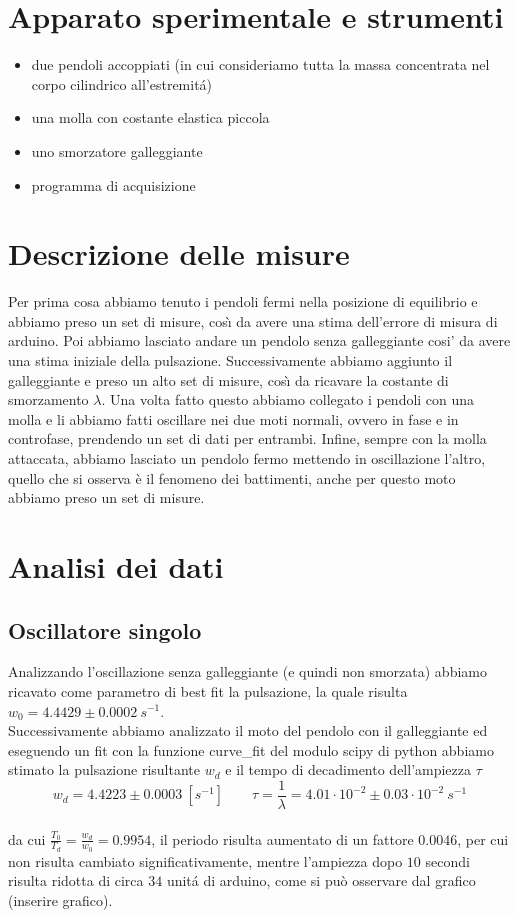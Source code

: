 \documentclass{article}
\begin{document}
	\section{Apparato sperimentale e strumenti}
	\begin{itemize}
		\item due pendoli accoppiati (in cui consideriamo tutta la massa concentrata nel corpo cilindrico all'estremit\'{a})
		\item una molla con costante elastica piccola
		\item uno smorzatore galleggiante
		\item programma di acquisizione 
	\end{itemize}
	
	\section{Descrizione delle misure}
		Per prima cosa abbiamo tenuto i pendoli fermi nella posizione di equilibrio e abbiamo preso un set di misure, cos\`{\i} da avere una stima dell'errore di misura di arduino. Poi abbiamo lasciato andare un pendolo senza galleggiante cosi' da avere una stima iniziale della pulsazione. Successivamente abbiamo aggiunto il galleggiante e preso un alto set di misure, cos\`{\i} da ricavare la costante di smorzamento $\lambda$. Una volta fatto questo abbiamo collegato i pendoli con una molla e li abbiamo fatti oscillare nei due moti normali, ovvero in fase e in controfase, prendendo un set di dati per entrambi. Infine, sempre con la molla attaccata, abbiamo lasciato un pendolo fermo mettendo in oscillazione l'altro, quello che si osserva \`{e} il fenomeno dei battimenti, anche per questo moto abbiamo preso un set di misure.
		
	\section{Analisi  dei dati}
	\subsection{Oscillatore singolo}
	Analizzando l'oscillazione senza galleggiante (e quindi non smorzata) abbiamo ricavato come parametro di best fit la pulsazione, la quale risulta $w_0 = 4.4429 \pm 0.0002\ s^{-1}$.\\
	Successivamente abbiamo analizzato il moto del pendolo con il galleggiante ed eseguendo un fit con la funzione curve\_fit del modulo scipy di python abbiamo stimato la pulsazione risultante $w_d$ e il tempo di decadimento dell'ampiezza $\tau$
	\begin{equation*}
	w_d = 4.4223 \pm 0.0003\ [s^{-1}]\qquad \tau = \frac{1}{\lambda} = 4.01\cdot10^{-2} \pm 0.03\cdot10^{-2}\ s^{-1}
	\end{equation*}\\
	da cui $\frac{T_0}{T_d} = \frac{w_d}{w_0} = 0.9954$, il periodo risulta aumentato di un fattore $0.0046$, per cui non risulta cambiato significativamente, mentre l'ampiezza dopo $10$ secondi risulta ridotta di circa $34$ unit\'{a} di arduino, come si pu\`{o} osservare dal grafico (inserire grafico).\\
	
\end{document}
